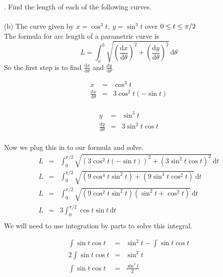 \documentclass[11pt]{exam}
\begin{document}
. Find the length of each of the following curves. \\
\\
\indent (b) The curve given by $x=\cos^3 t,\ y = \sin^3 t$ over $0 \leq t \leq \pi/2\\$
\\
The formula for arc length of a parametric curve is
$$L = \int_a^b \! \sqrt{\left(\frac{\mathrm{d}x}{\mathrm{d}\theta}\right)^2+\left(\frac{\mathrm{d}y}{\mathrm{d}\theta}\right)^2} \, \mathrm{d}\theta$$
So the first step is to find $\frac{\mathrm{d}x}{\mathrm{d}\theta}$ and $\frac{\mathrm{d}y}{\mathrm{d}\theta}$.\\
\noindent
\begin{minipage}{.5\linewidth}
	\begin{eqnarray*}
		x &=& \cos^3 t\\
 		\frac{\mathrm{d}x}{\mathrm{d}\theta}&=&3\cos^2 t (-\sin t)\\
	\end{eqnarray*}
\end{minipage}
\begin{minipage}{.5\linewidth}
	\begin{eqnarray*}
  		y&=&\sin^3 t\\
  		\frac{\mathrm{d}y}{\mathrm{d}\theta}&=&3\sin^2 t \cos t\\
	\end{eqnarray*}
\end{minipage}
Now we plug this in to our formula and solve.\\
\begin{eqnarray*}
	L &=& \int_0^{\pi/2} \! \sqrt{(3\cos^2 t (-\sin t))^2+(3\sin^2 t \cos t)^2} \, \mathrm{d}t\\
	L &=& \int_0^{\pi/2} \! \sqrt{(9\cos^4 t\sin^2 t)+(9\sin^4 t\cos^2 t)} \, \mathrm{d}t\\
	L &=& \int_0^{\pi/2} \! \sqrt{(9\cos^2 t\sin^2 t)(\sin^2 t+\cos^2 t)} \, \mathrm{d}t\\
	L &=& 3\int_0^{\pi/2} \! \cos t \sin t \, \mathrm{d}t\\	
\end{eqnarray*} 
We will need to use integration by parts to solve this integral.\\
\noindent
\begin{minipage}{.5\linewidth}
	\begin{eqnarray*}
 		\int \sin t \cos t &=& \sin^2 t - \int \sin t \cos t \\
 		2\int \sin t \cos t &=& \sin^2 t \\
 		\int \sin t \cos t &=& \frac{\sin^2 t}{2} \\
	\end{eqnarray*}
\end{minipage}
\end{document}
